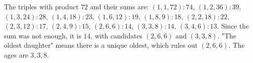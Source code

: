The triples with product $72$ and their sums are: $(1,1,72):74$, $(1,2,36):39$, $(1,3,24):28$, $(1,4,18):23$, $(1,6,12):19$, $(1,8,9):18$, $(2,2,18):22$, $(2,3,12):17$, $(2,4,9):15$, $(2,6,6):14$, $(3,3,8):14$, $(3,4,6):13$. Since the sum was not enough, it is $14$, with candidates $(2,6,6)$ and $(3,3,8)$. "The oldest daughter" means there is a unique oldest, which rules out $(2,6,6)$. The ages are $\boxed{3,3,8}$.
